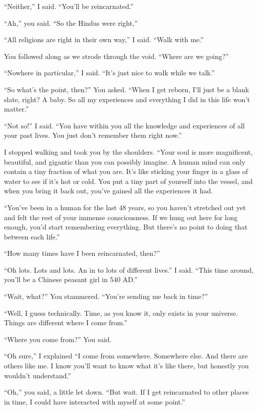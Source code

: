 \documentclass{article}
\begin{document}
“Neither,” I said. “You'll be reincarnated.”

“Ah,” you said. “So the Hindus were right,”

“All religions are right in their own way,” I said. “Walk with me.”

You followed along as we strode through the void. “Where are we going?”

“Nowhere in particular,” I said. “It's just nice to walk while we talk.”

“So what's the point, then?” You asked. “When I get reborn, I'll just be a blank slate, right? A baby. So all my experiences and everything I did in this life won't matter.”

“Not so!” I said. “You have within you all the knowledge and experiences of all your past lives. You just don't remember them right now.”

I stopped walking and took you by the shoulders. “Your soul is more magnificent, beautiful, and gigantic than you can possibly imagine. A human mind can only contain a tiny fraction of what you are. It's like sticking your finger in a glass of water to see if it's hot or cold. You put a tiny part of yourself into the vessel, and when you bring it back out, you've gained all the experiences it had.

“You've been in a human for the last 48 years, so you haven't stretched out yet and felt the rest of your immense consciousness. If we hung out here for long enough, you'd start remembering everything. But there's no point to doing that between each life.”

“How many times have I been reincarnated, then?”

“Oh lots. Lots and lots. An in to lots of different lives.” I said. “This time around, you'll be a Chinese peasant girl in 540 AD.”

“Wait, what?” You stammered. “You're sending me back in time?”

“Well, I guess technically. Time, as you know it, only exists in your universe. Things are different where I come from.”

“Where you come from?” You said.

“Oh sure,” I explained “I come from somewhere. Somewhere else. And there are others like me. I know you'll want to know what it's like there, but honestly you wouldn't understand.”

“Oh,” you said, a little let down. “But wait. If I get reincarnated to other places in time, I could have interacted with myself at some point.”
\end{document}
